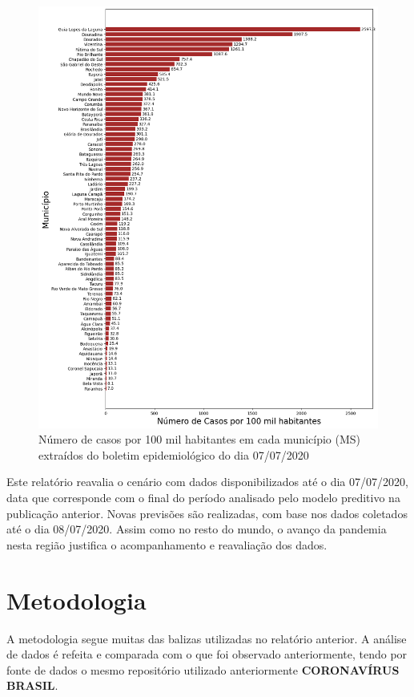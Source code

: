 \documentclass[12pt]{article}
\begin{document}
\begin{figure}[!htb]
  \centering
  \includegraphics[width=1\textwidth]{figs/casos_100_mil_por_municipio.png}
  \caption{Número de casos por 100 mil habitantes em cada município (MS) extraídos do boletim epidemiológico do dia 07/07/2020}
  \label{fig:casosMuni100k}
  \end{figure}


Este relatório reavalia o cenário com dados disponibilizados até o dia 07/07/2020, data que corresponde com o final do período analisado pelo modelo preditivo na publicação anterior. Novas previsões são realizadas, com base nos dados coletados até o dia 08/07/2020. Assim como no resto do mundo, o avanço da pandemia nesta região justifica o acompanhamento e reavaliação dos dados.

\section{Metodologia}\label{sec:met}

A metodologia segue muitas das balizas utilizadas no relatório anterior. A análise de dados é refeita e comparada com o que foi observado anteriormente, tendo por fonte de dados o mesmo repositório utilizado anteriormente \textbf{CORONAVÍRUS BRASIL}\cite{minsaude}.
\end{document}
